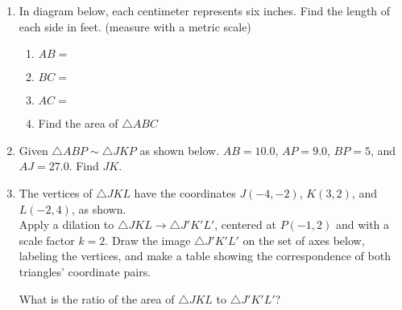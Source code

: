 \documentclass[12pt, twoside]{article}
\begin{document}
\begin{enumerate}
\item In diagram below, each centimeter represents six inches. Find the length of each side in feet. (measure with a metric scale)
  \begin{multicols}{2}
    \begin{enumerate}[itemsep=1.5cm]
      \item $AB=$
      \item $BC=$
      \item $AC=$ 
      \item Find the area of $\triangle ABC$
    \end{enumerate}
  \begin{center}
  \end{center}
  \end{multicols}%

\newpage
  \item Given $\triangle ABP \sim \triangle JKP$ as shown below. $AB=10.0$, $AP=9.0$, $BP=5$, and $AJ=27.0$. Find $JK$.
    \begin{flushright}
      \end{flushright}
      \vspace{0.5cm}

  \item The vertices of $\triangle JKL$ have the coordinates $J(-4,-2)$, $K(3,2)$, and $L(-2,4)$, as shown. \\[0.25cm]
    Apply a dilation to $\triangle JKL \rightarrow \triangle J'K'L'$, centered at $P(-1,2)$ and with a scale factor $k=2$. Draw the image $\triangle J'K'L'$ on the set of axes below, labeling the vertices, and make a table showing the correspondence of both triangles' coordinate pairs.
      \begin{flushright}
      \end{flushright}
      What is the ratio of the area of $\triangle JKL$ to $\triangle J'K'L'$?


\end{enumerate}
\end{document}
